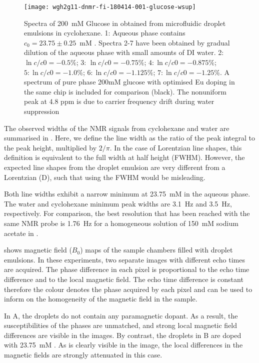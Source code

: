 \begin{figure}
\begin{center}
	\texttt{[image: wgh2g11-dnmr-fi-180414-001-glucose-wsup]}
\end{center}
\caption{Spectra of 200~mM Glucose in  obtained from microfluidic droplet emulsions in
	cyclohexane. 1: Aqueous phase contains $c_0=23.75\pm0.25$~mM . Spectra 2-7
	have been obtained by gradual dilution of the aqueous phase with small amounts of DI water.
	2: $\ln c/c0 = -0.5\%$; 3: $\ln c/c0 = -0.75\%$; $4: \ln c/c0 = -0.875\%$;
	$5: \ln c/c0 = -1.0\%$; $6: \ln c/c0 = -1.125\%$; $7: \ln c/c0 = -1.25\%$. A spectrum of pure phase 200mM glucose
	with optimised Eu doping in the same chip is included for comparison (black). The nonuniform peak at 4.8 ppm is due to carrier frequency drift during water suppression }
\label{fig:glucose-dilution}
\end{figure}


The observed widths of the NMR signals from cyclohexane and water
are summarised in . Here, we define the line width as
the ratio of the peak integral to the peak height, multiplied by $2/\pi$. In the
case of Lorentzian line shapes, this definition is equivalent to the full width at half height
(FWHM). However, the expected line shapes from the droplet emulsion are very different
from a Lorentzian (D), such that using the FWHM would be misleading.

Both line widths exhibit a narrow
minimum at 23.75~mM  in the aqueous phase. The water and
cyclohexane minimum peak widths are 3.1~Hz and 3.5~Hz, respectively. For comparison, the best resolution
that has been reached with the same NMR probe is 1.76~Hz for a homogeneous
solution of 150~mM sodium acetate in .\cite{Finch:2016gv}

 shows magnetic field ($B_0$) maps of the sample chambers filled
with droplet emulsions.
In these experiments, two separate
images with different echo times are acquired. The phase difference in each pixel is
proportional to the echo time difference and to the local magnetic field. The echo time difference is constant
therefore the colour denotes the phase acquired by each pixel and can be used to
inform on the homogeneity of the magnetic field in the sample.

In A, the droplets do not contain any paramagnetic dopant. As a result, the
susceptibilities of the phases are unmatched, and strong local magnetic field differences
are visible in the images. By contrast, the droplets in B are doped with 23.75~mM
. As is clearly visible in the image, the local differences in the magnetic
fields are strongly attenuated in this case.

